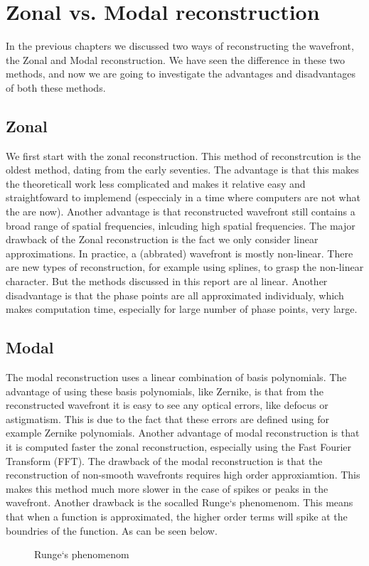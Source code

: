 \documentclass{article}
\begin{document}
\section{Zonal vs. Modal reconstruction}
In the previous chapters we discussed two ways of reconstructing the wavefront, the Zonal and Modal reconstruction. We have seen the difference in these two methods, and now we are going to investigate the advantages and disadvantages of both these methods.

\subsection{Zonal}
We first start with the zonal reconstruction. This method of reconstrcution is the oldest method, dating from the early seventies. The advantage is that this makes the theoreticall work less complicated and makes it relative easy and straightfoward to implemend (especcialy in a time where computers are not what the are now). Another advantage is that reconstructed wavefront still contains a broad range of spatial frequencies, inlcuding high spatial frequencies. 
\newline
\newline
The major drawback of the Zonal reconstruction is the fact we only consider linear approximations. In practice, a (abbrated) wavefront is mostly non-linear. There are new types of reconstruction, for example using splines, to grasp the non-linear character. But the methods discussed in this report are al linear. Another disadvantage is that the phase points are all approximated individualy, which makes computation time, especially for large number of phase points, very large.

\subsection{Modal}
The modal reconstruction uses a linear combination of basis polynomials. The advantage of using these basis polynomials, like Zernike, is that from the reconstructed wavefront it is easy to see any optical errors, like defocus or astigmatism. This is due to the fact that these errors are defined using for example Zernike polynomials. Another advantage of modal reconstruction is that it is computed faster the zonal reconstruction, especially using the Fast Fourier Transform (FFT).
\newline
\newline
The drawback of the modal reconstruction is that the reconstruction of non-smooth wavefronts requires high order approxiamtion. This makes this method much more slower in the case of spikes or peaks in the wavefront. Another drawback is the socalled Runge`s phenomenom. This means that when a function is approximated, the higher order terms will spike at the boundries of the function. As can be seen below.
\begin{figure}[h!]
  \centering
  \caption{Runge`s phenomenom}
\end{figure} 

% 
% 
\end{document}
